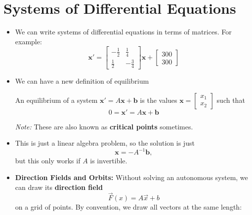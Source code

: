 \section{Systems of Differential Equations}
\begin{itemize}
    \item We can write systems of differential equations in terms of matrices. For example:
          \begin{equation}
              \bm{x}' = \begin{bmatrix}
                  -\frac{1}{2} & \frac{1}{4}  \\
                  \frac{1}{2}  & -\frac{3}{4}
              \end{bmatrix}\bm{x} + \begin{bmatrix}
                  300 \\ 300
              \end{bmatrix}
          \end{equation}
    \item We can have a new definition of equilibrium
          \begin{definition}
              An equilibrium of a system $\bm{x}'=A\bm{x}+\bm{b}$ is the values $\bm{x}=\begin{bmatrix}
                      x_1 \\ x_2
                  \end{bmatrix}$ such that
              \begin{equation}
                  0=\bm{x}'=A\bm{x}+\bm{b}
              \end{equation}
          \end{definition}
          \textit{Note:} These are also known as \textbf{critical points} sometimes.
    \item This is just a linear algebra problem, so the solution is just
          \begin{equation}
              \bm{x} = -A^{-1}\bm{b},
          \end{equation}
          but this only works if $A$ is invertible.
    \item \textbf{Direction Fields and Orbits:} Without solving an autonomous system, we can draw its \textbf{direction field}
          \begin{equation}
              \vec{F}(x) = A\vec{x}+b
          \end{equation}
          on a grid of points. By convention, we draw all vectors at the same length:
          \begin{itemize}

\end{itemize}
\end{itemize}
